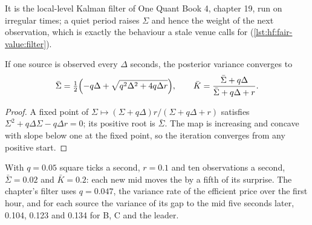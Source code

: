 It is the local-level Kalman filter of One Quant Book 4, chapter 19, run on irregular times; a quiet period raises $\Sigma$ and hence the weight of the
next observation, which is exactly the behaviour a stale venue calls for (\cref{lst:hf:fair-value:filter}).

\begin{proposition}\label{prop:hf:fair-value:steady}
If one source is observed every $\Delta$ seconds, the posterior variance converges to
\[
\bar\Sigma=\tfrac12\Bigl(-q\Delta+\sqrt{q^2\Delta^2+4q\Delta r}\Bigr),\qquad \bar K=\frac{\bar\Sigma+q\Delta}{\bar\Sigma+q\Delta+r}.
\]
\end{proposition}

\begin{proof}
A fixed point of $\Sigma\mapsto (\Sigma+q\Delta)r/(\Sigma+q\Delta+r)$ satisfies $\Sigma^2+q\Delta\Sigma-q\Delta r=0$; its positive root is
$\bar\Sigma$. The map is increasing
and concave with slope below one at the fixed point, so the iteration converges from any positive start.
\end{proof}

With $q=0.05$ square ticks a second, $r=0.1$ and ten observations a second, $\bar\Sigma=0.02$ and $\bar K=0.2$: each new mid moves the  by a
fifth of its surprise. The chapter's filter uses $q=0.047$, the variance rate of the efficient price over the first hour, and for each source the
variance of its gap to the mid five seconds later, 0.104, 0.123 and 0.134 for B, C and the leader.

\begin{omfigure}

\label{fig:hf:fair-value:sources}
\end{omfigure}

